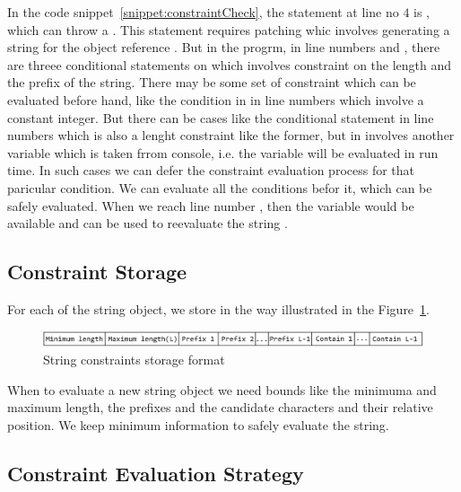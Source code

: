 In the code snippet~\ref{snippet:constraintCheck}, the statement at line no $4$
is , which can throw a
. This statement requires patching whic
involves generating a string for the object reference . But in the
progrm, in line numbers  and , there are threee
conditional statements on  which involves constraint on the length
and the prefix of the string. There may be some set of constraint which can be
evaluated before hand, like the condition in in line numbers  which
involve a constant integer. But there can be cases like the conditional
statement in line numbers  which is also a lenght constraint like the
former, but in involves another variable which is taken frrom console, i.e. the
variable will be evaluated in run time. In such cases we can defer the
constraint evaluation process for that paricular condition. We can evaluate all
the conditions befor it, which can be safely evaluated. When we reach line
number , then the variable  would be available and can be
used to reevaluate the string .

\subsection{Constraint Storage}
\label{subsubsec:constraintStorage}

For each of the string object, we store in the way illustrated in the
Figure~\ref{fig:constraint}.

\begin{figure}[t]
\centering
\includegraphics[width=\linewidth]{images/constraint.eps}
\caption{String constraints storage format}
\label{fig:constraint}
\end{figure}

When to evaluate a new string object we need bounds like the minimuma and maximum
length, the prefixes and the candidate characters and their relative position.
We keep minimum information to safely evaluate the string.

\subsection{Constraint Evaluation Strategy}
\label{subsubsec:constraintStorage}

